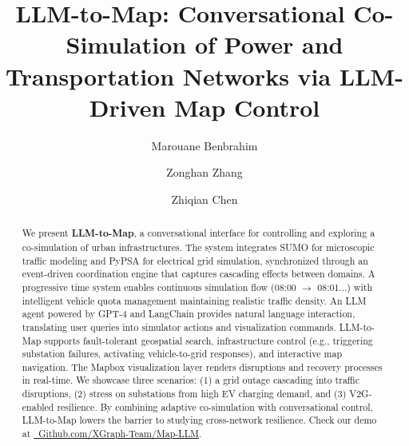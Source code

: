\documentclass[sigconf,review,nonacm]{acmart}
\begin{document}
\title{LLM-to-Map: Conversational Co-Simulation of Power and Transportation Networks via LLM-Driven Map Control}

\author{Marouane Benbrahim}

\author{Zonghan Zhang}

\author{Zhiqian Chen}

\renewcommand{\shortauthors}{Benbrahim et al.}

\begin{abstract}
We present \textbf{LLM-to-Map}, a conversational interface for controlling and exploring a co-simulation of urban infrastructures. The system integrates SUMO for microscopic traffic modeling and PyPSA for electrical grid simulation, synchronized through an event-driven coordination engine that captures cascading effects between domains. A progressive time system enables continuous simulation flow (08:00 $\rightarrow$ 08:01...) with intelligent vehicle quota management maintaining realistic traffic density. An LLM agent powered by GPT-4 and LangChain provides natural language interaction, translating user queries into simulator actions and visualization commands. LLM-to-Map supports fault-tolerant geospatial search, infrastructure control (e.g., triggering substation failures, activating vehicle-to-grid responses), and interactive map navigation. The Mapbox visualization layer renders disruptions and recovery processes in real-time. We showcase three scenarios: (1) a grid outage cascading into traffic disruptions, (2) stress on substations from high EV charging demand, and (3) V2G-enabled resilience. By combining adaptive co-simulation with conversational control, LLM-to-Map lowers the barrier to studying cross-network resilience. Check our demo at \href{https://github.com/XGraph-Team/Map-LLM}{\faGithub\ Github.com/XGraph-Team/Map-LLM}.
\end{abstract}

\maketitle
\end{document}
